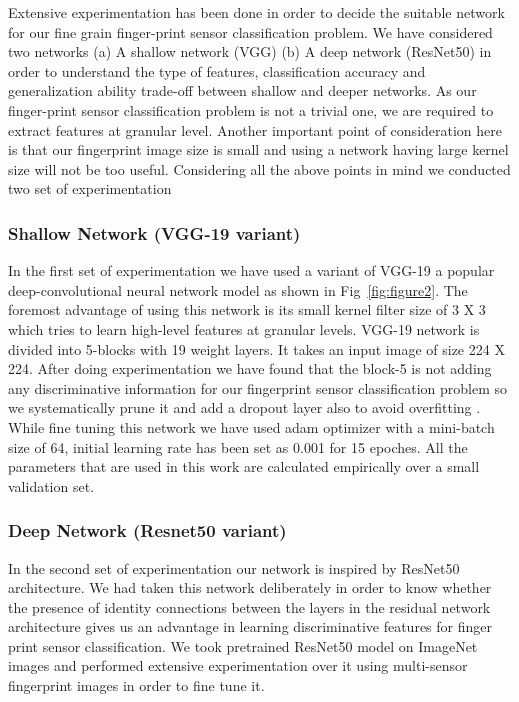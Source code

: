     Extensive experimentation has been done in order to decide the suitable network for our fine grain finger-print sensor classification problem. We have considered two networks (a) A shallow network (VGG) (b) A deep network (ResNet50) in order to understand the type of features, classification accuracy and generalization ability trade-off between shallow and deeper networks. As our finger-print sensor classification problem is not a trivial one, we are required to extract features at granular level. Another important point of consideration here is that our fingerprint image size is small and using a network having large kernel size will not be too useful. Considering all the above points in mind we conducted two set of experimentation

\subsubsection{Shallow Network (VGG-19 variant) }
	
	In the first set of experimentation we have used a variant of VGG-19 a popular deep-convolutional neural network model as shown in Fig~\ref{fig:figure2}. The foremost advantage of using this network is its small kernel filter size of 3 X 3 which tries to learn high-level features at granular levels. VGG-19 network is divided into 5-blocks with 19 weight layers. It takes an input image of size 224 X 224. After doing experimentation we have found that the block-5 is not adding any discriminative information for our fingerprint sensor classification problem so we systematically prune it and add a dropout layer also to avoid overfitting . While fine tuning this network we have used adam  optimizer with a mini-batch size of 64, initial learning rate has been set as 0.001 for 15 epoches. All the parameters that are used in this work are calculated empirically over a small validation set.

\subsubsection{Deep Network (Resnet50 variant) }
	 In the second set of experimentation our network is inspired by ResNet50 architecture. We had taken this network deliberately in order to know whether the presence of identity connections between the layers in the residual network architecture gives us an advantage in learning discriminative features for finger print sensor classification. We took pretrained ResNet50 model on ImageNet images and performed extensive experimentation over it using multi-sensor fingerprint images in order to fine tune it.
     
